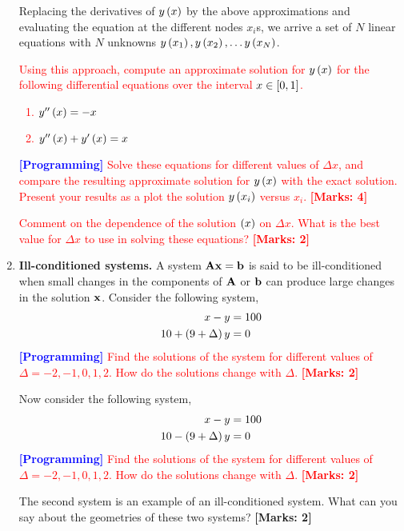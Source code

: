 \documentclass[12pt]{article}
\def\mf{\ensuremath\mathbf}
\def\lp{\ensuremath\left(}
\def\rp{\ensuremath\right)}
\def\ls{\ensuremath\left[}
\def\rs{\ensuremath\right]}
\newcommand{\ct}[1]{\lp #1\rp}
\newcommand{\dt}[1]{\ls #1\rs}
\begin{document}
\begin{enumerate}
Replacing the derivatives of $y\ct{x}$ by the above approximations and evaluating the equation at the different nodes $x_i$s, we arrive a set of $N$ linear equations with $N$ unknowns $y\ct{x_1}, y\ct{x_2}, \ldots y\ct{x_N}$. 

\textcolor{red}{Using this approach, compute an approximate solution for $y\ct{x}$ for the following differential equations over the interval $x \in \dt{0, 1}$.
\begin{enumerate}
        \item $y''\ct{x} = -x$
        \item $y''\ct{x} + y'\ct{x} = x$
\end{enumerate}
\textcolor{blue}{\textbf{[Programming]}} Solve these equations for different values of $\Delta x$, and compare the resulting approximate solution for $y\ct{x}$ with the exact solution.   Present your results as a plot the solution $y\ct{x_i}$ versus $x_i$. \textbf{[Marks: 4]}}

\textcolor{red}{Comment on the dependence of the solution $\ct{x}$ on $\Delta x$. What is the best value for $\Delta x$ to use in solving these equations? \textbf{[Marks: 2]}}

\item \textbf{Ill-conditioned systems.} A system $\mf{A}\mf{x} = \mf{b}$ is said to be ill-conditioned when small changes in the components of $\mf{A}$ or $\mf{b}$ can produce large changes in the solution $\mf{x}$. Consider the following system,
\begin{align}
x - y &= 100 \nonumber \\
10 + \ct{9 + \Delta}y &= 0 \nonumber
\end{align}
\textcolor{red}{\textcolor{blue}{\textbf{[Programming]}} Find the solutions of the system for different values of $\Delta = -2, -1, 0, 1, 2$. How do the solutions change with $\Delta$. \textbf{[Marks: 2]}} 

Now consider the following system,
\begin{align}
x - y &= 100 \nonumber \\
10 - \ct{9 + \Delta}y &= 0 \nonumber
\end{align}
\textcolor{red}{\textcolor{blue}{\textbf{[Programming]}} Find the solutions of the system for different values of $\Delta = -2, -1, 0, 1, 2$. How do the solutions change with $\Delta$. \textbf{[Marks: 2]}} 

The second system is an example of an ill-conditioned system. What can you say about the geometries of these two systems? \textbf{[Marks: 2]}


\end{enumerate}
\end{document}
